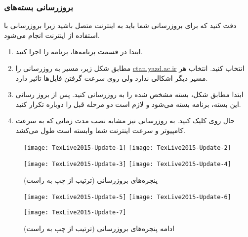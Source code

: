 \subsubsection{بروزرسانی بسته‌های }
دقت کنید که برای بروزرسانی شما باید به اینترنت متصل باشید زیرا بروزرسانی با استفاده از اینترنت انجام می‌شود.
\begin{enumerate}
\item ابتدا در قسمت برنامه‌ها، برنامه  را اجرا کنید.
\item مطابق شکل زیر، مسیر به روزرسانی را \url{ctan.yazd.ac.ir} انتخاب کنید. انتخاب هر مسیر دیگر اشکالی ندارد ولی روی سرعت گرفتن فایل‌ها تاثیر دارد. 
\item ابتدا مطابق شکل، بسته مشخص شده را به روزرسانی کنید. پس از بروز رسانی این بسته، برنامه بسته می‌شود و لازم است دو مرحله قبل را دوباره تکرار کنید.
\item حال روی  کلیک کنید. به روزرسانی نیز مشابه نصب مدت زمانی که به سرعت کامپیوتر و سرعت اینترنت شما وابسته است طول می‌کشد.
\end{enumerate}
\latin
\begin{figure}[h]
\texttt{[image: TexLive2015-Update-1]}\hfill
\texttt{[image: TexLive2015-Update-2]}
\vspace*{4mm}

\texttt{[image: TexLive2015-Update-3]}\hfill
\texttt{[image: TexLive2015-Update-4]}
\vspace*{4mm}



%
\persian
\caption{پنجره‌های بروزرسانی  (ترتیب از چپ به راست)}
\end{figure}
\begin{figure}[t]
%

\texttt{[image: TexLive2015-Update-5]}\hfill
\texttt{[image: TexLive2015-Update-6]}
\vspace*{4mm}

\texttt{[image: TexLive2015-Update-7]}
\persian
\caption{ادامه پنجره‌های بروزرسانی    (ترتیب از چپ به راست)}
\end{figure}

